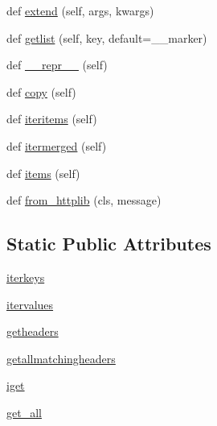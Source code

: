 \begin{DoxyCompactItemize}
\item 
def \hyperlink{classpip_1_1__vendor_1_1urllib3_1_1__collections_1_1HTTPHeaderDict_a60cd0d0364f9ed3ce743306a70961c20}{extend} (self, args, kwargs)
\item 
def \hyperlink{classpip_1_1__vendor_1_1urllib3_1_1__collections_1_1HTTPHeaderDict_ab554610e20a55090fb766d864da8ac4b}{getlist} (self, key, default=\+\_\+\+\_\+marker)
\item 
def \hyperlink{classpip_1_1__vendor_1_1urllib3_1_1__collections_1_1HTTPHeaderDict_a01a07ed6d6f908c35b54adf7c1898ed1}{\+\_\+\+\_\+repr\+\_\+\+\_\+} (self)
\item 
def \hyperlink{classpip_1_1__vendor_1_1urllib3_1_1__collections_1_1HTTPHeaderDict_ab5c4bd378ca90dc502b78b3664f50b94}{copy} (self)
\item 
def \hyperlink{classpip_1_1__vendor_1_1urllib3_1_1__collections_1_1HTTPHeaderDict_acab3544e4616ea2ad432954ed716960a}{iteritems} (self)
\item 
def \hyperlink{classpip_1_1__vendor_1_1urllib3_1_1__collections_1_1HTTPHeaderDict_aec114d6a14004fde2823e48ea4c420b0}{itermerged} (self)
\item 
def \hyperlink{classpip_1_1__vendor_1_1urllib3_1_1__collections_1_1HTTPHeaderDict_ae40b7c8adb3a4a74a2fe63ee3d86173e}{items} (self)
\item 
def \hyperlink{classpip_1_1__vendor_1_1urllib3_1_1__collections_1_1HTTPHeaderDict_a7b9a02f9abc7b826da5415c0edf1d4ed}{from\+\_\+httplib} (cls, message)
\end{DoxyCompactItemize}
\subsection*{Static Public Attributes}
\begin{DoxyCompactItemize}
\item 
\hyperlink{classpip_1_1__vendor_1_1urllib3_1_1__collections_1_1HTTPHeaderDict_a661e62e065fbf142c5c074cd19ed4c89}{iterkeys}
\item 
\hyperlink{classpip_1_1__vendor_1_1urllib3_1_1__collections_1_1HTTPHeaderDict_a6095c612e8563bdb9e5b6f612e91dff2}{itervalues}
\item 
\hyperlink{classpip_1_1__vendor_1_1urllib3_1_1__collections_1_1HTTPHeaderDict_ac6e6eb05e65f85b4538701ad24dc2e43}{getheaders}
\item 
\hyperlink{classpip_1_1__vendor_1_1urllib3_1_1__collections_1_1HTTPHeaderDict_aaff7cd9c2569904911a82c4819325793}{getallmatchingheaders}
\item 
\hyperlink{classpip_1_1__vendor_1_1urllib3_1_1__collections_1_1HTTPHeaderDict_ab28ca91fd71386d2c441cc75e21280b7}{iget}
\item 
\hyperlink{classpip_1_1__vendor_1_1urllib3_1_1__collections_1_1HTTPHeaderDict_a4a350d8bb96fd18bab40822702db506b}{get\+\_\+all}
\end{DoxyCompactItemize}


